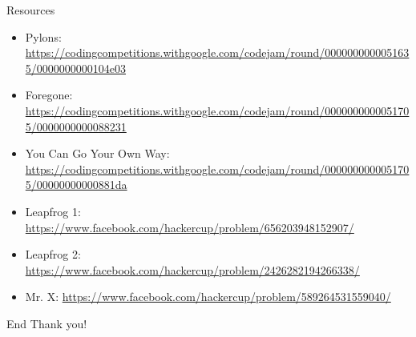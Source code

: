 \begin{frame}{Resources}
\begin{itemize}
  \item Pylons: \small \url{https://codingcompetitions.withgoogle.com/codejam/round/0000000000051635/0000000000104e03}
  \item Foregone: \small \url{https://codingcompetitions.withgoogle.com/codejam/round/0000000000051705/0000000000088231}
  \item You Can Go Your Own Way: \small \url{https://codingcompetitions.withgoogle.com/codejam/round/0000000000051705/00000000000881da}
  \item Leapfrog 1: \small \url{https://www.facebook.com/hackercup/problem/656203948152907/}
  \item Leapfrog 2: \small \url{https://www.facebook.com/hackercup/problem/2426282194266338/}
  \item Mr. X: \small \url {https://www.facebook.com/hackercup/problem/589264531559040/}
\end{itemize}
\end{frame}

\begin{frame}{End}
    \centering
    \Huge {Thank you!}
\end{frame}
